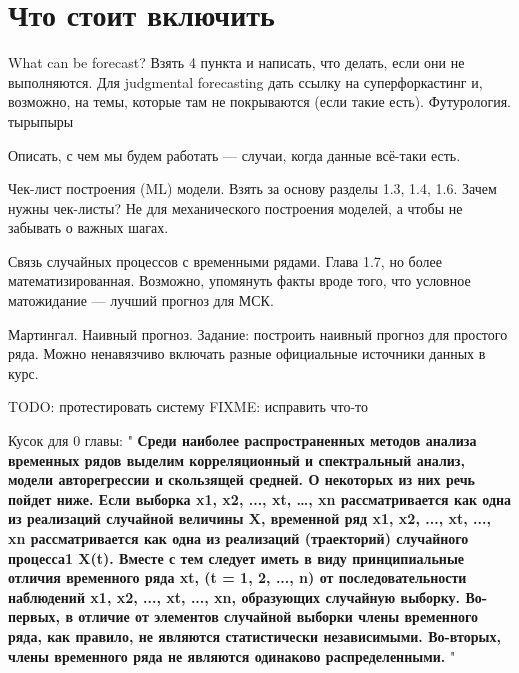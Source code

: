 \section{Что стоит включить}

What can be forecast? Взять 4 пункта и написать, что делать, если они
не выполняются. Для judgmental forecasting дать ссылку на
суперфоркастинг и, возможно, на темы, которые там не покрываются
(если такие есть). Футурология. тырыпыры

Описать, с чем мы будем работать — случаи, когда данные всё-таки есть.

Чек-лист построения (ML) модели. Взять за основу разделы 1.3, 1.4,
1.6. Зачем нужны чек-листы? Не для механического построения моделей,
а чтобы не забывать о важных шагах.

Связь случайных процессов с временными рядами. Глава 1.7, но более
математизированная. Возможно, упомянуть факты вроде того, что
условное матожидание — лучший прогноз для МСК.

Мартингал. Наивный прогноз.
Задание: построить наивный прогноз для простого ряда. Можно
ненавязчиво включать разные официальные источники данных в курс.

TODO: протестировать систему
FIXME: исправить что-то

Кусок для 0 главы:
"
\textbf{Среди наиболее распространенных методов анализа временных рядов выделим
корреляционный и спектральный анализ, модели авторегрессии и скользящей средней. О
некоторых из них речь пойдет ниже. Если выборка x1, x2, ..., xt, …, xn рассматривается как одна
из реализаций случайной величины X, временной ряд x1, x2, ..., xt, ..., xn рассматривается как одна
из реализаций (траекторий) случайного процесса1 X(t). Вместе с тем следует иметь в виду
принципиальные отличия временного ряда xt, (t = 1, 2, ..., n) от последовательности наблюдений
x1, x2, ..., xt, ..., xn, образующих случайную выборку.
Во-первых, в отличие от элементов случайной выборки члены временного ряда, как
правило, не являются статистически независимыми.
Во-вторых, члены временного ряда не являются одинаково распределенными.} "

